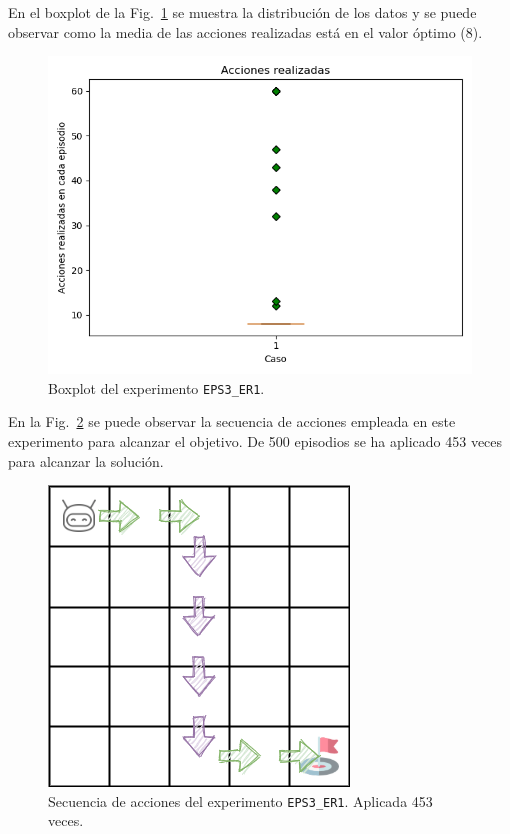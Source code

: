 En el boxplot de la Fig.~\ref{fig:dim5_lr0.01_ep0_boxplot} se muestra la distribución de los datos y se puede observar como la media de las acciones realizadas está en el valor óptimo (8).\\

\begin{figure}
    \centering
    \includegraphics[scale=0.4]{cap5_experimentacion/images/dim5_lr0.01_ep0_boxplot.png}
    \caption{Boxplot del experimento \texttt{EPS3\_ER1}.}
    \label{fig:dim5_lr0.01_ep0_boxplot}
\end{figure}

En la Fig.~\ref{fig:dim5_lr0.01_ep0_453} se puede observar la secuencia de acciones empleada en este experimento para alcanzar el objetivo. De 500 episodios se ha aplicado 453 veces para alcanzar la solución. 

\begin{figure}
    \centering
    \includegraphics[scale=0.4]{cap5_experimentacion/images/dim5_lr0.01_ep0_453.png}
    \caption{Secuencia de acciones del experimento \texttt{EPS3\_ER1}. Aplicada 453 veces.}
    \label{fig:dim5_lr0.01_ep0_453}
\end{figure}

